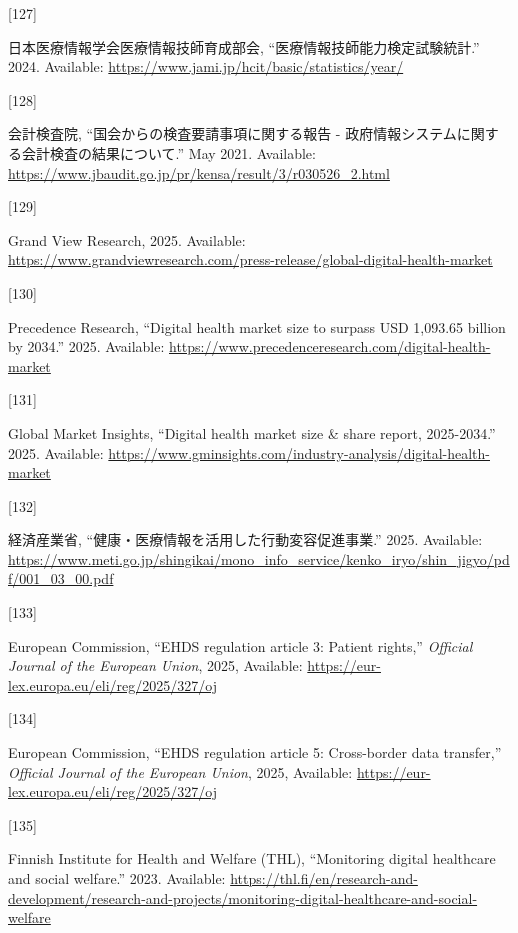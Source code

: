 \documentclass[
  a4paper,
  a4paper,
  11pt]{ltjsbook}
\newlength{\cslhangindent}
\newlength{\csllabelwidth}
\newenvironment{CSLReferences}[2] %
 {\begin{list}{}{%
  \setlength{\itemindent}{0pt}
  \setlength{\leftmargin}{0pt}
  \setlength{\parsep}{0pt}
  \ifodd #1
   \setlength{\leftmargin}{\cslhangindent}
   \setlength{\itemindent}{-1\cslhangindent}
  \fi
  \setlength{\itemsep}{#2\baselineskip}}}
 {\end{list}}
\newcommand{\CSLLeftMargin}[1]{\parbox[t]{\csllabelwidth}{\strut#1\strut}}
\newcommand{\CSLRightInline}[1]{\parbox[t]{\linewidth - \csllabelwidth}{\strut#1\strut}}
\begin{document}
\begin{CSLReferences}{0}{0}
\CSLLeftMargin{{[}127{]} }%
\CSLRightInline{日本医療情報学会医療情報技師育成部会,
{``医療情報技師能力検定試験統計.''} 2024. Available:
\url{https://www.jami.jp/hcit/basic/statistics/year/}}

\CSLLeftMargin{{[}128{]} }%
\CSLRightInline{会計検査院, {``国会からの検査要請事項に関する報告 -
政府情報システムに関する会計検査の結果について.''} May 2021. Available:
\url{https://www.jbaudit.go.jp/pr/kensa/result/3/r030526_2.html}}

\CSLLeftMargin{{[}129{]} }%
\CSLRightInline{Grand View Research, 2025. Available:
\url{https://www.grandviewresearch.com/press-release/global-digital-health-market}}

\CSLLeftMargin{{[}130{]} }%
\CSLRightInline{Precedence Research, {``Digital health market size to
surpass USD 1,093.65 billion by 2034.''} 2025. Available:
\url{https://www.precedenceresearch.com/digital-health-market}}

\CSLLeftMargin{{[}131{]} }%
\CSLRightInline{Global Market Insights, {``Digital health market size \&
share report, 2025-2034.''} 2025. Available:
\url{https://www.gminsights.com/industry-analysis/digital-health-market}}

\CSLLeftMargin{{[}132{]} }%
\CSLRightInline{経済産業省,
{``健康・医療情報を活用した行動変容促進事業.''} 2025. Available:
\url{https://www.meti.go.jp/shingikai/mono_info_service/kenko_iryo/shin_jigyo/pdf/001_03_00.pdf}}

\CSLLeftMargin{{[}133{]} }%
\CSLRightInline{European Commission, {``EHDS regulation article 3:
Patient rights,''} \emph{Official Journal of the European Union}, 2025,
Available: \url{https://eur-lex.europa.eu/eli/reg/2025/327/oj}}

\CSLLeftMargin{{[}134{]} }%
\CSLRightInline{European Commission, {``EHDS regulation article 5:
Cross-border data transfer,''} \emph{Official Journal of the European
Union}, 2025, Available:
\url{https://eur-lex.europa.eu/eli/reg/2025/327/oj}}

\CSLLeftMargin{{[}135{]} }%
\CSLRightInline{Finnish Institute for Health and Welfare (THL),
{``Monitoring digital healthcare and social welfare.''} 2023. Available:
\url{https://thl.fi/en/research-and-development/research-and-projects/monitoring-digital-healthcare-and-social-welfare}}


\end{CSLReferences}
\end{document}

